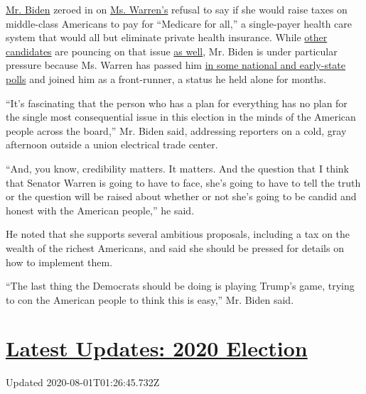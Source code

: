 \href{https://www.nytimes.com/2019/11/01/us/politics/iowa-poll-warren-biden.html}{Mr.
Biden} zeroed in on
\href{https://www.nytimes.com/2019/11/01/us/politics/iowa-poll-warren-biden.html}{Ms.
Warren's} refusal to say if she would raise taxes on middle-class
Americans to pay for ``Medicare for all,'' a single-payer health care
system that would all but eliminate private health insurance. While
\href{https://www.nytimes.com/2019/10/15/us/politics/amy-klobuchar-elizabeth-warren-debate.html}{other
candidates} are pouncing on that issue
\href{https://www.nytimes.com/2019/10/15/us/politics/medicare-for-all-elizabeth-warren.html}{as
well}, Mr. Biden is under particular pressure because Ms. Warren has
passed him
\href{https://www.nytimes.com/interactive/2020/us/elections/democratic-polls.html}{in
some national and early-state polls} and joined him as a front-runner, a
status he held alone for months.

``It's fascinating that the person who has a plan for everything has no
plan for the single most consequential issue in this election in the
minds of the American people across the board,'' Mr. Biden said,
addressing reporters on a cold, gray afternoon outside a union
electrical trade center.

``And, you know, credibility matters. It matters. And the question that
I think that Senator Warren is going to have to face, she's going to
have to tell the truth or the question will be raised about whether or
not she's going to be candid and honest with the American people,'' he
said.

He noted that she supports several ambitious proposals, including a tax
on the wealth of the richest Americans, and said she should be pressed
for details on how to implement them.

``The last thing the Democrats should be doing is playing Trump's game,
trying to con the American people to think this is easy,'' Mr. Biden
said.

\hypertarget{latest-updates-2020-election}{%
\section{\texorpdfstring{\href{https://www.nytimes.com/2020/07/31/us/elections/biden-vs-trump.html?action=click\&pgtype=Article\&state=default\&region=MAIN_CONTENT_1\&context=storylines_live_updates}{Latest
Updates: 2020
Election}}{Latest Updates: 2020 Election}}\label{latest-updates-2020-election}}

Updated 2020-08-01T01:26:45.732Z

